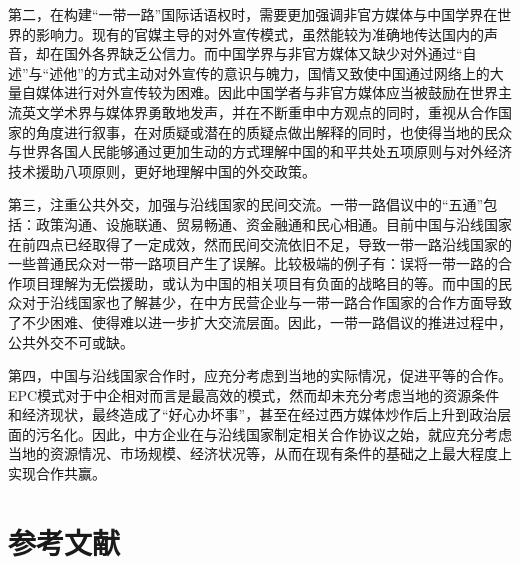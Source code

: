 \documentclass[a4paper,UTF8]{article}
\begin{document}
		第二，在构建“一带一路”国际话语权时，需要更加强调非官方媒体与中国学界在世界的影响力。现有的官媒主导的对外宣传模式，虽然能较为准确地传达国内的声音，却在国外各界缺乏公信力。而中国学界与非官方媒体又缺少对外通过“自述”与“述他”的方式主动对外宣传的意识与魄力，国情又致使中国通过网络上的大量自媒体进行对外宣传较为困难。因此中国学者与非官方媒体应当被鼓励在世界主流英文学术界与媒体界勇敢地发声，并在不断重申中方观点的同时，重视从合作国家的角度进行叙事，在对质疑或潜在的质疑点做出解释的同时，也使得当地的民众与世界各国人民能够通过更加生动的方式理解中国的和平共处五项原则与对外经济技术援助八项原则，更好地理解中国的外交政策。
		
		第三，注重公共外交，加强与沿线国家的民间交流。一带一路倡议中的“五通”包括：政策沟通、设施联通、贸易畅通、资金融通和民心相通。目前中国与沿线国家在前四点已经取得了一定成效，然而民间交流依旧不足，导致一带一路沿线国家的一些普通民众对一带一路项目产生了误解。比较极端的例子有：误将一带一路的合作项目理解为无偿援助，或认为中国的相关项目有负面的战略目的等。而中国的民众对于沿线国家也了解甚少，在中方民营企业与一带一路合作国家的合作方面导致了不少困难、使得难以进一步扩大交流层面。因此，一带一路倡议的推进过程中，公共外交不可或缺。
		
		第四，中国与沿线国家合作时，应充分考虑到当地的实际情况，促进平等的合作。EPC模式对于中企相对而言是最高效的模式，然而却未充分考虑当地的资源条件和经济现状，最终造成了“好心办坏事”，甚至在经过西方媒体炒作后上升到政治层面的污名化。因此，中方企业在与沿线国家制定相关合作协议之始，就应充分考虑当地的资源情况、市场规模、经济状况等，从而在现有条件的基础之上最大程度上实现合作共赢。
		
		
	\section{参考文献}
\end{document}
